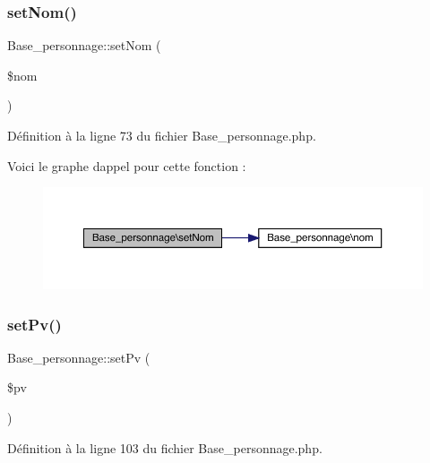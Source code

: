 \subsubsection{\texorpdfstring{set\+Nom()}{setNom()}}
{\footnotesize\ttfamily Base\+\_\+personnage\+::set\+Nom (\begin{DoxyParamCaption}\item[{}]{\$nom }\end{DoxyParamCaption})}



Définition à la ligne 73 du fichier Base\+\_\+personnage.\+php.

Voici le graphe d\textquotesingle{}appel pour cette fonction \+:\nopagebreak
\begin{figure}[H]
\begin{center}
\leavevmode
\includegraphics[width=350pt]{class_base__personnage_a44eae499b82470a6c99e01b68a73a6d9_cgraph}
\end{center}
\end{figure}
\mbox{\label{class_base__personnage_aa16912b89559e2aa9c96e2d1b2cd9d4f}} 
\subsubsection{\texorpdfstring{set\+Pv()}{setPv()}}
{\footnotesize\ttfamily Base\+\_\+personnage\+::set\+Pv (\begin{DoxyParamCaption}\item[{}]{\$pv }\end{DoxyParamCaption})}



Définition à la ligne 103 du fichier Base\+\_\+personnage.\+php.

